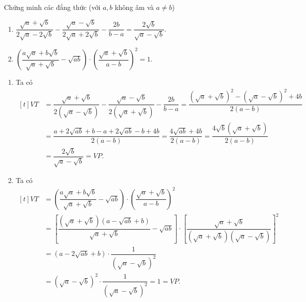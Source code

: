\begin{vd}	Chứng minh các đẳng thức (với $ a,b $ không âm và $ a\ne b $)
	\begin{enumerate}
		\item $ \dfrac{\sqrt a + \sqrt b}{2\sqrt a - 2\sqrt b} - \dfrac{\sqrt a - \sqrt b}{2\sqrt a + 2\sqrt b} - \dfrac{2b}{b-a} = \dfrac{2\sqrt b}{\sqrt a - \sqrt b}. $
		\item $ \left(\dfrac{a\sqrt a + b\sqrt b}{\sqrt a + \sqrt b} - \sqrt{ab}\right) \cdot\left(\dfrac{\sqrt a + \sqrt b}{a- b}\right)^2 =1.$
	\end{enumerate}
    \loigiai
    {
    	\begin{enumerate}
    		\item Ta có
    		 $\begin{aligned}[t]
    		VT &= \dfrac{\sqrt a + \sqrt b}{2(\sqrt a - \sqrt b)} - \dfrac{\sqrt a - \sqrt b}{2(\sqrt a + \sqrt b)} - \dfrac{2b}{b-a} = \dfrac{(\sqrt a + \sqrt b)^2 - (\sqrt a - \sqrt b)^2 +4b}{2(a-b)}\\
    		 &=\dfrac{a+2\sqrt{ab} +b - a + 2\sqrt{ab} -b + 4b}{2(a-b)}
    		 = \dfrac{4\sqrt{ab} +4b } {2(a-b)}= \dfrac{4\sqrt b(\sqrt a + \sqrt b)}{2(a-b)}\\
    		 &= \dfrac{2\sqrt b}{\sqrt a - \sqrt b} = VP.
    		 \end{aligned}$
    		 \item Ta có
    		 $\begin{aligned}[t]
    		VT&= \left(\dfrac{a\sqrt a + b\sqrt b}{\sqrt a + \sqrt b} - \sqrt{ab}\right)\cdot  \left(\dfrac{\sqrt a + \sqrt b}{a- b}\right)^2\\&= \left[\dfrac{(\sqrt a + \sqrt b)(a - \sqrt{ab} + b)}{\sqrt a + \sqrt b} - \sqrt{ab}\right]\cdot \left[\dfrac{\sqrt a + \sqrt b}{(\sqrt a + \sqrt b)(\sqrt a - \sqrt b)}\right]^2  \\
    		 &= (a - 2\sqrt{ab} +b)\cdot \dfrac{1}{(\sqrt a - \sqrt b)^2} \\
    		 &= (\sqrt a - \sqrt b)^2\cdot \dfrac{1}{(\sqrt a - \sqrt b)^2} = 1 = VP. 
    		 \end{aligned}$
    	\end{enumerate}
   }   
\end{vd}
